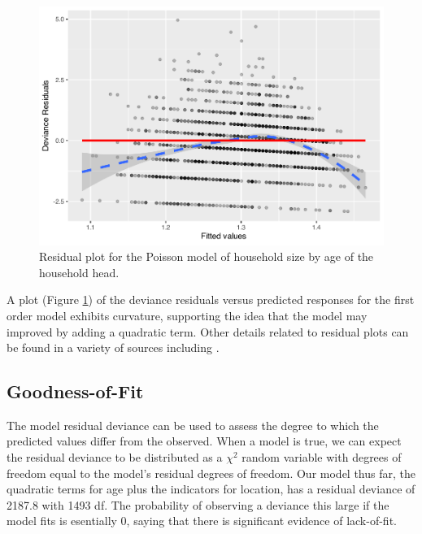 \documentclass[
]{krantz}
\newenvironment{Shaded}{\begin{snugshade}}{\end{snugshade}}
\newcommand{\CommentTok}[1]{\textcolor[rgb]{0.37,0.37,0.37}{\textit{#1}}}
\newcommand{\DecValTok}[1]{\textcolor[rgb]{0.06,0.06,0.06}{#1}}
\newcommand{\FunctionTok}[1]{\textcolor[rgb]{0.27,0.27,0.27}{\textbf{#1}}}
\newcommand{\NormalTok}[1]{#1}
\newcommand{\SpecialCharTok}[1]{\textcolor[rgb]{0.43,0.43,0.43}{\textbf{#1}}}
\begin{document}
\begin{figure}

{\centering \includegraphics[width=0.6\linewidth]{bookdown-BeyondMLR_files/figure-latex/resid1-1} 

}

\caption{Residual plot for the Poisson model of household size by age of the household head.}\label{fig:resid1}
\end{figure}

A plot (Figure \ref{fig:resid1}) of the deviance residuals versus predicted responses for the first order model exhibits curvature, supporting the idea that the model may improved by adding a quadratic term. Other details related to residual plots can be found in a variety of sources including \citet{McCullagh1989}.

\subsection{Goodness-of-Fit}\label{sec-PoisGOF}

The model residual deviance can be used to assess the degree to which the predicted values differ from the observed. When a model is true, we can expect the residual deviance to be distributed as a \(\chi^2\) random variable with degrees of freedom equal to the model's residual degrees of freedom. Our model thus far, the quadratic terms for age plus the indicators for location, has a residual deviance of 2187.8 with 1493 df. The probability of observing a deviance this large if the model fits is esentially 0, saying that there is significant evidence of lack-of-fit.

\begin{Shaded}
\end{Shaded}
\end{document}
